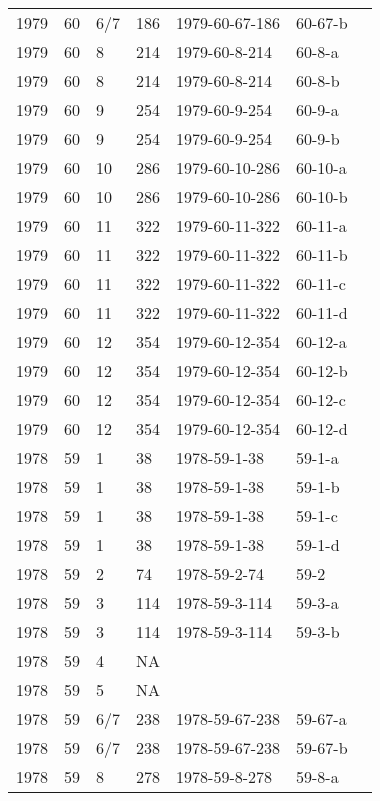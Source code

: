 \begin{longtable}{ |l|l|l|l|p{2.7cm}|l|p{2cm}| }
 1979 & 60 &   6/7 &     186 & 1979-60-67-186 & 60-67-b & \\
 1979 & 60 &     8 &     214 & 1979-60-8-214  & 60-8-a & \\
 1979 & 60 &     8 &     214 & 1979-60-8-214  & 60-8-b & \\
 1979 & 60 &     9 &     254 & 1979-60-9-254  & 60-9-a & \\
 1979 & 60 &     9 &     254 & 1979-60-9-254  & 60-9-b & \\
 1979 & 60 &    10 &     286 & 1979-60-10-286 & 60-10-a & \\
 1979 & 60 &    10 &     286 & 1979-60-10-286 & 60-10-b & \\
 1979 & 60 &    11 &     322 & 1979-60-11-322 & 60-11-a & \\
 1979 & 60 &    11 &     322 & 1979-60-11-322 & 60-11-b & \\
 1979 & 60 &    11 &     322 & 1979-60-11-322 & 60-11-c & \\
 1979 & 60 &    11 &     322 & 1979-60-11-322 & 60-11-d & \\
 1979 & 60 &    12 &     354 & 1979-60-12-354 & 60-12-a & \\
 1979 & 60 &    12 &     354 & 1979-60-12-354 & 60-12-b & \\
 1979 & 60 &    12 &     354 & 1979-60-12-354 & 60-12-c & \\
 1979 & 60 &    12 &     354 & 1979-60-12-354 & 60-12-d & \\
 1978 & 59 &     1 &      38 & 1978-59-1-38   & 59-1-a & \\
 1978 & 59 &     1 &      38 & 1978-59-1-38   & 59-1-b & \\
 1978 & 59 &     1 &      38 & 1978-59-1-38   & 59-1-c & \\
 1978 & 59 &     1 &      38 & 1978-59-1-38   & 59-1-d & \\
 1978 & 59 &     2 &      74 & 1978-59-2-74   & 59-2 & \\
 1978 & 59 &     3 &     114 & 1978-59-3-114  & 59-3-a & \\
 1978 & 59 &     3 &     114 & 1978-59-3-114  & 59-3-b & \\
 1978 & 59 &     4 &      NA &                &  & \\
 1978 & 59 &     5 &      NA &                &  & \\
 1978 & 59 &   6/7 &     238 & 1978-59-67-238 & 59-67-a & \\
 1978 & 59 &   6/7 &     238 & 1978-59-67-238 & 59-67-b & \\
 1978 & 59 &     8 &     278 & 1978-59-8-278  & 59-8-a & \\

\end{longtable}
